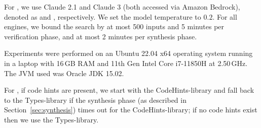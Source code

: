 \documentclass[sigconf,review,anonymous]{acmart}
\begin{document}
For \llm, we use Claude 2.1 and Claude 3 (both accessed via Amazon Bedrock), denoted as \llma and \llmb, respectively. We set the model temperature to $0.2$.
%
For all engines, we bound the search by at most 500 inputs and 5 minutes per verification phase, and at
most 2 minutes per synthesis phase. 

Experiments were performed on an Ubuntu
22.04 x64 operating system running in a laptop with 16\,GB RAM and
11th Gen Intel Core i7-11850H at 2.50\,GHz.  The JVM used was Oracle JDK 15.02.


For \tool, if code hints are present, we start with the CodeHints-library and fall back to the Types-library if the synthesis phase (as described in Section~\ref{sec:synthesis}) times out for the CodeHints-library; if no code hints exist then we use the Types-library.










\end{document}
